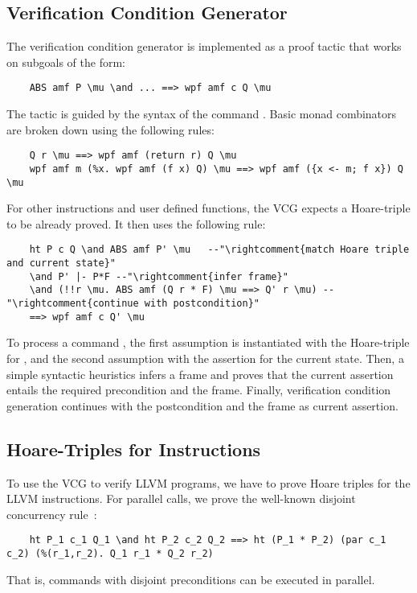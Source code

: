 \documentclass[sn-mathphys,Numbered]{sn-jnl}
\theoremstyle{thmstyleone}%
\theoremstyle{definition}%
\theoremstyle{thmstylethree}%
\begin{document}
  \subsection{Verification Condition Generator}
  The verification condition generator is implemented as a proof tactic that works on subgoals of the form:
  \begin{lstlisting}
    ABS amf P \mu \and ... ==> wpf amf c Q \mu
  \end{lstlisting}
  The tactic is guided by the syntax of the command .
  Basic monad combinators are broken down using the following rules:
  \begin{lstlisting}
    Q r \mu ==> wpf amf (return r) Q \mu
    wpf amf m (%x. wpf amf (f x) Q) \mu ==> wpf amf ({x <- m; f x}) Q \mu
  \end{lstlisting}
  For other instructions and user defined functions, the VCG expects a Hoare-triple to be already proved.
  It then uses the following rule:
  \begin{lstlisting}
    ht P c Q \and ABS amf P' \mu   --"\rightcomment{match Hoare triple and current state}"
    \and P' |- P*F --"\rightcomment{infer frame}"
    \and (!!r \mu. ABS amf (Q r * F) \mu ==> Q' r \mu) --"\rightcomment{continue with postcondition}"
    ==> wpf amf c Q' \mu
  \end{lstlisting}
  To process a command , the first assumption is instantiated with the Hoare-triple for ,
  and the second assumption with the assertion  for the current state.
  Then, a simple syntactic heuristics infers a frame  and proves that the
  current assertion  entails the required precondition  and the frame.
  Finally, verification condition generation continues with the postcondition  and the frame as current assertion.


  \subsection{Hoare-Triples for Instructions}
  To use the VCG to verify LLVM programs, we have to prove Hoare triples for the LLVM instructions.
  For parallel calls, we prove the well-known disjoint concurrency rule~\cite{OH04}:
  \begin{lstlisting}
    ht P_1 c_1 Q_1 \and ht P_2 c_2 Q_2 ==> ht (P_1 * P_2) (par c_1 c_2) (%(r_1,r_2). Q_1 r_1 * Q_2 r_2)
  \end{lstlisting}
  That is, commands with disjoint preconditions can be executed in parallel.
\end{document}
